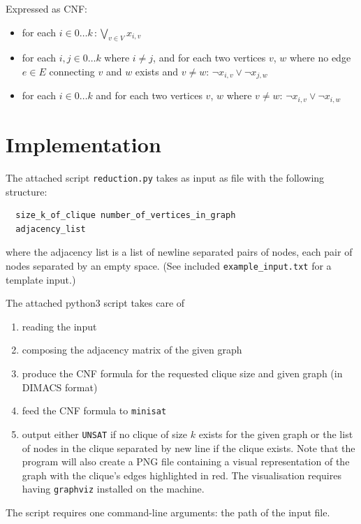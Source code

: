 \documentclass[12pt]{article}
\begin{document}
Expressed as CNF:

\begin{itemize}
  \item for each $i \in 0 \dots k\,: \bigvee_{v \in V} x_{i,v}$
  \item for each $i,j \in 0 \dots k$ where $i \neq j$, and for each two vertices $v$, $w$ where no edge $e \in E$ connecting $v$ and $w$ exists and $v \neq w$: $\lnot x_{i,v} \lor \lnot x_{j,w}$
  \item for each $i \in 0 \dots k$ and for each two vertices $v$, $w$ where $v \neq w$: $\lnot x_{i,v} \lor \lnot x_{i,w}$
\end{itemize}

\section{Implementation}

The attached script \texttt{reduction.py} takes as input as file with the following structure:

\begin{verbatim}
  size_k_of_clique number_of_vertices_in_graph
  adjacency_list
\end{verbatim}

where the adjacency list is a list of newline separated pairs of nodes, each pair of nodes separated by an empty space. (See included \texttt{example\_input.txt} for a template input.)

The attached python3 script takes care of
\begin{enumerate}
  \item reading the input
  \item composing the adjacency matrix of the given graph
  \item produce the CNF formula for the requested clique size and given graph (in DIMACS format)
  \item feed the CNF formula to \texttt{minisat}
  \item output either \texttt{UNSAT} if no clique of size $k$ exists for the given graph or the list of nodes in the clique separated by new line if the clique exists. Note that the program will also create a PNG file containing a visual representation of the graph with the clique's edges highlighted in red. The visualisation requires having \texttt{graphviz} installed on the machine.
\end{enumerate}

The script requires one command-line arguments: the path of the input file.
\end{document}
